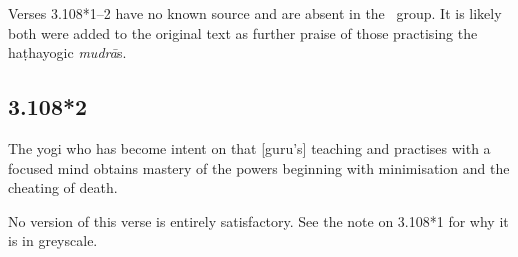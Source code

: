 \begin{ekdosis}
\begin{philcomm}[hp03_108_1]
Verses 3.108*1–2 have no known source and are absent in the \textalpha\ group. It is likely both were added to the original text as further praise of those practising the haṭhayogic \emph{mudrā}s.
\end{philcomm}


\subsection*{3.108*2}
\begin{translation}[hp03_108_2]
The yogi who has become intent on that [guru's] teaching and practises with a focused mind obtains mastery of the powers beginning with minimisation and the cheating of death.
\end{translation}



\begin{philcomm}[hp03_108_2]
No version of this verse is entirely satisfactory. See the note on 3.108*1 for why it is in greyscale.
\end{philcomm}

\end{ekdosis}

